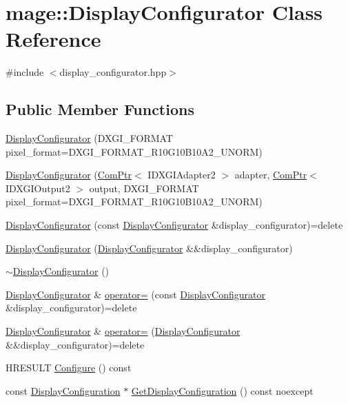 \hypertarget{classmage_1_1_display_configurator}{}\section{mage\+:\+:Display\+Configurator Class Reference}
\label{classmage_1_1_display_configurator}


{\ttfamily \#include $<$display\+\_\+configurator.\+hpp$>$}

\subsection*{Public Member Functions}
\begin{DoxyCompactItemize}
\item 
\hyperlink{classmage_1_1_display_configurator_a88fe13ec0a6902fdc1666a2710a16647}{Display\+Configurator} (D\+X\+G\+I\+\_\+\+F\+O\+R\+M\+AT pixel\+\_\+format=D\+X\+G\+I\+\_\+\+F\+O\+R\+M\+A\+T\+\_\+\+R10\+G10\+B10\+A2\+\_\+\+U\+N\+O\+RM)
\item 
\hyperlink{classmage_1_1_display_configurator_aa3a636b64e538adc338de0825c4415af}{Display\+Configurator} (\hyperlink{namespacemage_ae74f374780900893caa5555d1031fd79}{Com\+Ptr}$<$ I\+D\+X\+G\+I\+Adapter2 $>$ adapter, \hyperlink{namespacemage_ae74f374780900893caa5555d1031fd79}{Com\+Ptr}$<$ I\+D\+X\+G\+I\+Output2 $>$ output, D\+X\+G\+I\+\_\+\+F\+O\+R\+M\+AT pixel\+\_\+format=D\+X\+G\+I\+\_\+\+F\+O\+R\+M\+A\+T\+\_\+\+R10\+G10\+B10\+A2\+\_\+\+U\+N\+O\+RM)
\item 
\hyperlink{classmage_1_1_display_configurator_a20d8fa60a9d511a114e603dddf1a3716}{Display\+Configurator} (const \hyperlink{classmage_1_1_display_configurator}{Display\+Configurator} \&display\+\_\+configurator)=delete
\item 
\hyperlink{classmage_1_1_display_configurator_aacf6436e2b16f883684826fe0ad0abdd}{Display\+Configurator} (\hyperlink{classmage_1_1_display_configurator}{Display\+Configurator} \&\&display\+\_\+configurator)
\item 
\hyperlink{classmage_1_1_display_configurator_af6546383269503e3cab077e4bf54556e}{$\sim$\+Display\+Configurator} ()
\item 
\hyperlink{classmage_1_1_display_configurator}{Display\+Configurator} \& \hyperlink{classmage_1_1_display_configurator_adf24194f83a0971a1c3076c1a23d1699}{operator=} (const \hyperlink{classmage_1_1_display_configurator}{Display\+Configurator} \&display\+\_\+configurator)=delete
\item 
\hyperlink{classmage_1_1_display_configurator}{Display\+Configurator} \& \hyperlink{classmage_1_1_display_configurator_a9d98a955cdbaf3bfe8913a4b561ad08d}{operator=} (\hyperlink{classmage_1_1_display_configurator}{Display\+Configurator} \&\&display\+\_\+configurator)=delete
\item 
H\+R\+E\+S\+U\+LT \hyperlink{classmage_1_1_display_configurator_aa84373fba5d7806f065f7633a03f7d64}{Configure} () const
\item 
const \hyperlink{structmage_1_1_display_configuration}{Display\+Configuration} $\ast$ \hyperlink{classmage_1_1_display_configurator_a9371158cf1e2686f43ece9e1a53ee3b6}{Get\+Display\+Configuration} () const noexcept
\end{DoxyCompactItemize}
